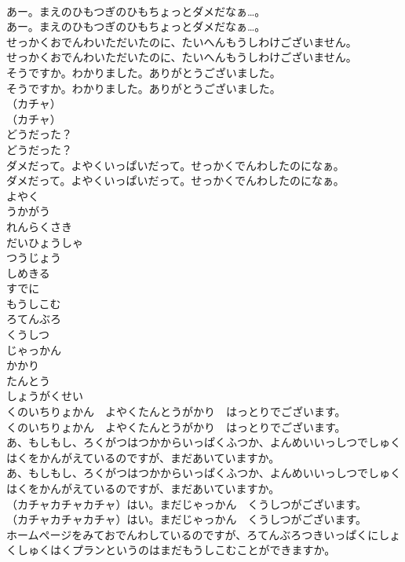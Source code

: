 \documentclass[8pt]{extreport}
\begin{document}
\begin{CJK}{UTF8}{min}
\\	あー。まえのひもつぎのひもちょっとダメだなぁ…。
\\	あー。まえのひもつぎのひもちょっとダメだなぁ…。
\\	せっかくおでんわいただいたのに、たいへんもうしわけございません。
\\	せっかくおでんわいただいたのに、たいへんもうしわけございません。
\\	そうですか。わかりました。ありがとうございました。
\\	そうですか。わかりました。ありがとうございました。
\\	（カチャ）
\\	（カチャ）
\\	どうだった？
\\	どうだった？
\\	ダメだって。よやくいっぱいだって。せっかくでんわしたのになぁ。
\\	ダメだって。よやくいっぱいだって。せっかくでんわしたのになぁ。
\\	よやく
\\	うかがう
\\	れんらくさき
\\	だいひょうしゃ
\\	つうじょう
\\	しめきる
\\	すでに
\\	もうしこむ
\\	ろてんぶろ
\\	くうしつ
\\	じゃっかん
\\	かかり
\\	たんとう
\\	しょうがくせい
\\	くのいちりょかん　よやくたんとうがかり　はっとりでございます。
\\	くのいちりょかん　よやくたんとうがかり　はっとりでございます。
\\	あ、もしもし、ろくがつはつかからいっぱくふつか、よんめいいっしつでしゅくはくをかんがえているのですが、まだあいていますか。
\\	あ、もしもし、ろくがつはつかからいっぱくふつか、よんめいいっしつでしゅくはくをかんがえているのですが、まだあいていますか。
\\	（カチャカチャカチャ）はい。まだじゃっかん　くうしつがございます。
\\	（カチャカチャカチャ）はい。まだじゃっかん　くうしつがございます。
\\	ホームページをみておでんわしているのですが、ろてんぶろつきいっぱくにしょくしゅくはくプランというのはまだもうしこむことができますか。

\end{CJK}
\end{document}
